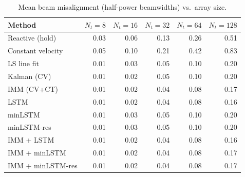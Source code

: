 \begin{table}[t]
\centering
\caption{Mean beam misalignment (half-power beamwidths) vs.\ array size.}\label{tab:beam}
\begin{tabular}{lrrrrr}
\toprule
Method & $N_t{=}8$ & $N_t{=}16$ & $N_t{=}32$ & $N_t{=}64$ & $N_t{=}128$ \\
\midrule
Reactive (hold) & 0.03 & 0.06 & 0.13 & 0.26 & 0.51 \\
Constant velocity & 0.05 & 0.10 & 0.21 & 0.42 & 0.83 \\
LS line fit & 0.01 & 0.03 & 0.05 & 0.10 & 0.20 \\
Kalman (CV) & 0.01 & 0.02 & 0.05 & 0.10 & 0.20 \\
IMM (CV+CT) & 0.01 & 0.02 & 0.04 & 0.08 & 0.17 \\
LSTM & 0.01 & 0.02 & 0.04 & 0.08 & 0.16 \\
minLSTM & 0.01 & 0.03 & 0.05 & 0.10 & 0.20 \\
minLSTM-res & 0.01 & 0.03 & 0.05 & 0.10 & 0.20 \\
IMM + LSTM & 0.01 & 0.02 & 0.04 & 0.08 & 0.16 \\
IMM + minLSTM & 0.01 & 0.02 & 0.04 & 0.08 & 0.17 \\
IMM + minLSTM-res & 0.01 & 0.02 & 0.04 & 0.08 & 0.17 \\
\bottomrule
\end{tabular}
\end{table}
